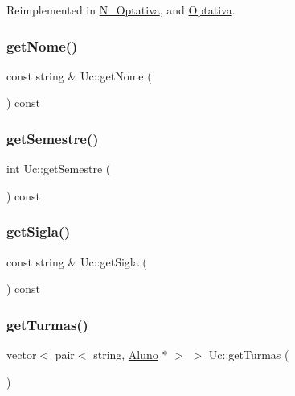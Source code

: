 Reimplemented in \hyperlink{class_n___optativa_a596634b068f013adb820683ff1f50566}{N\+\_\+\+Optativa}, and \hyperlink{class_optativa_a647029a53dd8c9c5b997730e57981a05}{Optativa}.

\hypertarget{class_uc_a27188d9339641df1be60e14afbead17e}{}\label{class_uc_a27188d9339641df1be60e14afbead17e} 
\subsubsection{\texorpdfstring{get\+Nome()}{getNome()}}
{\footnotesize\ttfamily const string \& Uc\+::get\+Nome (\begin{DoxyParamCaption}{ }\end{DoxyParamCaption}) const}

\hypertarget{class_uc_a68a645144f76f245b73bdaaa2575ea7c}{}\label{class_uc_a68a645144f76f245b73bdaaa2575ea7c} 
\subsubsection{\texorpdfstring{get\+Semestre()}{getSemestre()}}
{\footnotesize\ttfamily int Uc\+::get\+Semestre (\begin{DoxyParamCaption}{ }\end{DoxyParamCaption}) const}

\hypertarget{class_uc_a16ccd7563b4be5ef6d15d28ea2293d50}{}\label{class_uc_a16ccd7563b4be5ef6d15d28ea2293d50} 
\subsubsection{\texorpdfstring{get\+Sigla()}{getSigla()}}
{\footnotesize\ttfamily const string \& Uc\+::get\+Sigla (\begin{DoxyParamCaption}{ }\end{DoxyParamCaption}) const}

\hypertarget{class_uc_ac2a824827d686ee674bb8c2e9af70882}{}\label{class_uc_ac2a824827d686ee674bb8c2e9af70882} 
\subsubsection{\texorpdfstring{get\+Turmas()}{getTurmas()}}
{\footnotesize\ttfamily vector$<$ pair$<$ string, \hyperlink{class_aluno}{Aluno} $\ast$ $>$ $>$ Uc\+::get\+Turmas (\begin{DoxyParamCaption}{ }\end{DoxyParamCaption})}

